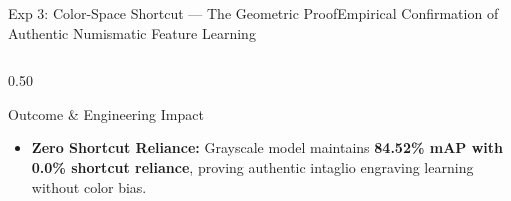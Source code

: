 \begin{frame}{Exp 3: Color-Space Shortcut --- The Geometric Proof}{Empirical Confirmation of Authentic Numismatic Feature Learning}
\begin{columns}[c]
\begin{column}{0.50\textwidth}
            \vspace{0.06cm}
            \begin{alertblockcustom}{Outcome \& Engineering Impact}
                \scriptsize
                \begin{itemize}\setlength{\itemsep}{1.5pt}
                    \item \textbf{Zero Shortcut Reliance:} Grayscale model maintains \textbf{84.52\% mAP with 0.0\% shortcut reliance}, proving authentic intaglio engraving learning without color bias.
                \end{itemize}
            \end{alertblockcustom}
        \end{column}
    \end{columns}
\end{frame}

